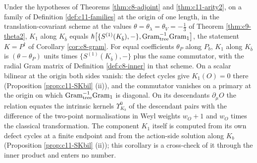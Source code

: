 \begin{corollary}
\label{cor:c11-K}
Under the hypotheses of Theorems \ref{thm:c8-adjoint} and \ref{thm:c11-arity2}, on a family of Definition \ref{def:c11-families} at the origin of one length, in the translation-covariant scheme at the values $\theta=\theta_\lambda=\theta_V=-\tfrac13$ of Theorem \ref{thm:c9-theta2}, $K_1$ along $K_{\bar b}$ equals $\hbar\big[\{S^{(1)}(K_{\bar b}),-\},\mathrm{Gram}_{\rm tree}^{-1}\mathrm{Gram}_{\rm 1}\big]$, the statement $K=P^\dagger$ of Corollary \ref{cor:c8-gram}. For equal coefficients $\theta_P$ along $P_b$, $K_1$ along $K_{\bar b}$ is $(\theta-\theta_P)$ units times $\{S^{(1)}(K_{\bar b}),-\}$ plus the same commutator, with the radial Gram matrix of Definition \ref{def:c8-inner} in that scheme. On a scalar bilinear at the origin both sides vanish: the defect cycles give $K_1(O)=0$ there (Proposition \ref{prop:c11-SKbil} (ii)), and the commutator vanishes on a primary at the origin on which $\mathrm{Gram}_{\rm tree}^{-1}\mathrm{Gram}_{\rm 1}$ is diagonal. On its descendants $\partial_\mu O$ the relation equates the intrinsic kernels $\Upsilon^0_{K_b}$ of the descendant pairs with the difference of the two-point normalisations in Weyl weights $w_O+1$ and $w_O$ times the classical transformation. The component $K_1$ itself is computed from its own defect cycles at a finite endpoint and from the action-side solution along $K_b$ (Proposition \ref{prop:c11-SKbil} (ii)); this corollary is a cross-check of it through the inner product and enters no number.
\end{corollary}
